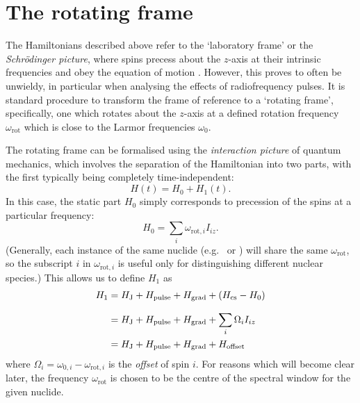 \section{The rotating frame}
\label{sec:theory__rotating_frame}

The Hamiltonians described above refer to the `laboratory frame' or the \textit{Schr\"odinger picture}, where spins precess about the $z$-axis at their intrinsic frequencies and obey the equation of motion .
However, this proves to often be unwieldy, in particular when analysing the effects of radiofrequency pulses.
It is standard procedure to transform the frame of reference to a `rotating frame', specifically, one which rotates about the $z$-axis at a defined rotation frequency $\omega_\text{rot}$ which is close to the Larmor frequencies $\omega_0$.

The rotating frame can be formalised using the \textit{interaction picture} of quantum mechanics,\autocite{Sakurai2021} which involves the separation of the Hamiltonian into two parts, with the first typically being completely time-independent:
\begin{equation}
    \label{eq:interaction_ham}
    H(t) = H_0 + H_1(t).
\end{equation}
In this case, the static part $H_0$ simply corresponds to precession of the spins at a particular frequency:
\begin{equation}
    \label{eq:interaction_ham0}
    H_0 = \sum_i \omega_{\text{rot},i}I_{iz}.
\end{equation}
(Generally, each instance of the same nuclide (e.g.\ \proton{} or \carbon{}) will share the same $\omega_\text{rot}$, so the subscript $i$ in $\omega_{\text{rot},i}$ is useful only for distinguishing different nuclear species.)
This allows us to define $H_1$ as
\begin{align}
    \label{eq:reduced_ham}
    H_1 &= H_\text{J} + H_\text{pulse} + H_\text{grad} + \left(H_\text{cs} - H_0\right) \\[7pt] \notag
        &= H_\text{J} + H_\text{pulse} + H_\text{grad} + \sum_i \Omega_i I_{iz} \\ \notag
        &= H_\text{J} + H_\text{pulse} + H_\text{grad} + H_\text{offset}
\end{align}
where $\Omega_i = \omega_{0,i} - \omega_{\text{rot},i}$ is the \textit{offset} of spin $i$.
For reasons which will become clear later, the frequency $\omega_\text{rot}$ is chosen to be the centre of the spectral window for the given nuclide.

